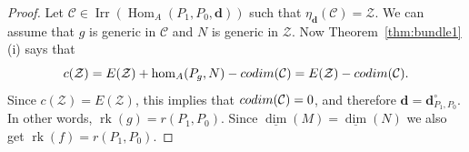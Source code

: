 \documentclass[10pt,a4paper]{amsart}
\newcommand{\Hom}{\operatorname{Hom}}
\newcommand{\bd}{\mathbf{d}}
\newcommand{\cC}{{\mathcal C}}
\newcommand{\calZ}{\mathcal{Z}}
\newcommand{\dimv}{\underline{\dim}}
\newcommand{\irr}{\operatorname{Irr}}
\newcommand{\rk}{\operatorname{rk}}
\begin{document}
\begin{proof}
Let $\cC \in \irr(\Hom_A(P_1,P_0,\bd))$ such that
$\eta_\bd(\cC) = \calZ$.
We can assume that $g$ is generic in $\cC$ and $N$ is generic in
$\calZ$.
Now Theorem~\ref{thm:bundle1}(i) says that
$$
c(\calZ) = E(\calZ) + \hom_A(P_g,N) - {\rm codim}(\cC)
= E(\calZ) - {\rm codim}(\cC).
$$
Since $c(\calZ) = E(\calZ)$,
this implies that ${\rm codim}(\cC) = 0$, and therefore
$\bd = \bd_{P_1,P_0}^\circ$.
In other words, $\rk(g) = r(P_1,P_0)$.
Since $\dimv(M) = \dimv(N)$ we also get $\rk(f) = r(P_1,P_0)$.
\end{proof}
\end{document}
